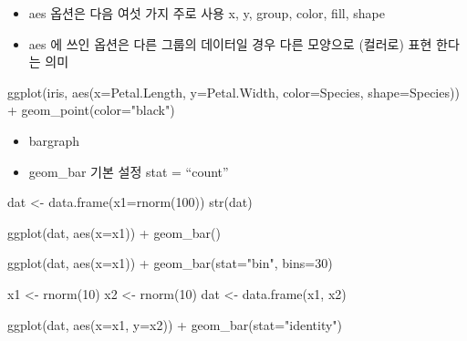 \documentclass[
]{book}
\newenvironment{Shaded}{\begin{snugshade}}{\end{snugshade}}
\newcommand{\AttributeTok}[1]{\textcolor[rgb]{0.77,0.63,0.00}{#1}}
\newcommand{\DecValTok}[1]{\textcolor[rgb]{0.00,0.00,0.81}{#1}}
\newcommand{\FunctionTok}[1]{\textcolor[rgb]{0.00,0.00,0.00}{#1}}
\newcommand{\NormalTok}[1]{#1}
\newcommand{\OtherTok}[1]{\textcolor[rgb]{0.56,0.35,0.01}{#1}}
\newcommand{\SpecialCharTok}[1]{\textcolor[rgb]{0.00,0.00,0.00}{#1}}
\newcommand{\StringTok}[1]{\textcolor[rgb]{0.31,0.60,0.02}{#1}}
\providecommand{\tightlist}{%
  \setlength{\itemsep}{0pt}\setlength{\parskip}{0pt}}
\begin{document}
\begin{itemize}
\tightlist
\item
  aes 옵션은 다음 여섯 가지 주로 사용 x, y, group, color, fill, shape
\item
  aes 에 쓰인 옵션은 다른 그룹의 데이터일 경우 다른 모양으로 (컬러로) 표현 한다는 의미
\end{itemize}

\begin{Shaded}
\begin{Highlighting}[]
\FunctionTok{ggplot}\NormalTok{(iris, }\FunctionTok{aes}\NormalTok{(}\AttributeTok{x=}\NormalTok{Petal.Length, }
                 \AttributeTok{y=}\NormalTok{Petal.Width, }
                 \AttributeTok{color=}\NormalTok{Species, }
                 \AttributeTok{shape=}\NormalTok{Species)) }\SpecialCharTok{+} 
  \FunctionTok{geom\_point}\NormalTok{(}\AttributeTok{color=}\StringTok{"black"}\NormalTok{)}
\end{Highlighting}
\end{Shaded}

\begin{itemize}
\tightlist
\item
  bargraph
\item
  geom\_bar 기본 설정 stat = ``count''
\end{itemize}

\begin{Shaded}
\begin{Highlighting}[]
\NormalTok{dat }\OtherTok{\textless{}{-}} \FunctionTok{data.frame}\NormalTok{(}\AttributeTok{x1=}\FunctionTok{rnorm}\NormalTok{(}\DecValTok{100}\NormalTok{))}
\FunctionTok{str}\NormalTok{(dat)}

\FunctionTok{ggplot}\NormalTok{(dat, }\FunctionTok{aes}\NormalTok{(}\AttributeTok{x=}\NormalTok{x1)) }\SpecialCharTok{+}
  \FunctionTok{geom\_bar}\NormalTok{()}

\FunctionTok{ggplot}\NormalTok{(dat, }\FunctionTok{aes}\NormalTok{(}\AttributeTok{x=}\NormalTok{x1)) }\SpecialCharTok{+}
  \FunctionTok{geom\_bar}\NormalTok{(}\AttributeTok{stat=}\StringTok{"bin"}\NormalTok{, }\AttributeTok{bins=}\DecValTok{30}\NormalTok{)}
\end{Highlighting}
\end{Shaded}

\begin{Shaded}
\begin{Highlighting}[]
\NormalTok{x1 }\OtherTok{\textless{}{-}} \FunctionTok{rnorm}\NormalTok{(}\DecValTok{10}\NormalTok{)}
\NormalTok{x2 }\OtherTok{\textless{}{-}} \FunctionTok{rnorm}\NormalTok{(}\DecValTok{10}\NormalTok{)}
\NormalTok{dat }\OtherTok{\textless{}{-}} \FunctionTok{data.frame}\NormalTok{(x1, x2)}

\FunctionTok{ggplot}\NormalTok{(dat, }\FunctionTok{aes}\NormalTok{(}\AttributeTok{x=}\NormalTok{x1, }\AttributeTok{y=}\NormalTok{x2)) }\SpecialCharTok{+}
  \FunctionTok{geom\_bar}\NormalTok{(}\AttributeTok{stat=}\StringTok{"identity"}\NormalTok{)}
\end{Highlighting}
\end{Shaded}
\end{document}

